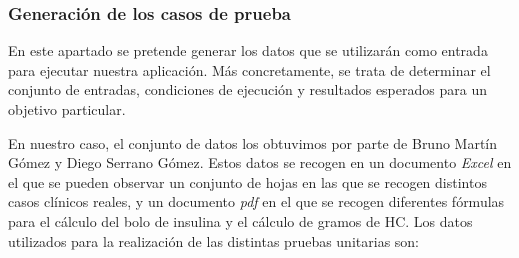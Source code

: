 \subsubsection{Generación de los casos de prueba}
En este apartado se pretende generar los datos que se utilizarán como entrada para ejecutar nuestra aplicación. Más concretamente, se trata de determinar el conjunto de entradas, condiciones de ejecución y resultados esperados para un objetivo particular.

En nuestro caso, el conjunto de datos los obtuvimos por parte de Bruno Martín Gómez y Diego Serrano Gómez. Estos datos se recogen en un documento \textit{Excel} en el que se pueden observar un conjunto de hojas en las que se recogen distintos casos clínicos reales, y un documento \textit{pdf} en el que se recogen diferentes fórmulas para el cálculo del bolo de insulina y el cálculo de gramos de HC. Los datos utilizados para la realización de las distintas pruebas unitarias son:
